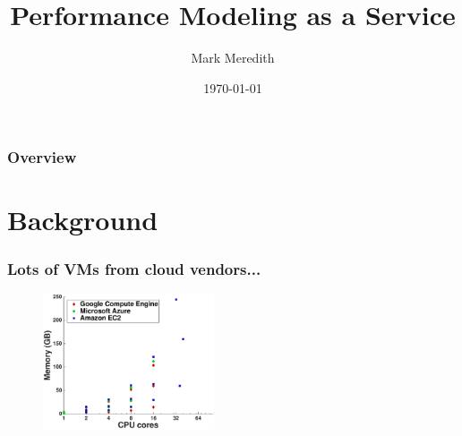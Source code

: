 \documentclass{beamer}
\title[PMAAS]{Performance Modeling as a Service} %
\author{Mark Meredith} %
\institute[Penn State] %
{
Pennsylvania State University \\ %
\medskip
\textit{mwm126@cse.psu.edu} %
}
\date{\today} %
\begin{document}
\begin{frame}
\titlepage %
\end{frame}

\begin{frame}
\frametitle{Overview} %
\tableofcontents %
\end{frame}




\section{Background}
\begin{frame}
\frametitle{Lots of VMs from cloud vendors...}
\begin{figure}[htbp]
\centering
\includegraphics[width=0.45\textwidth]{cloud_vm_types.eps}
\end{figure}
\end{frame}
\end{document}
